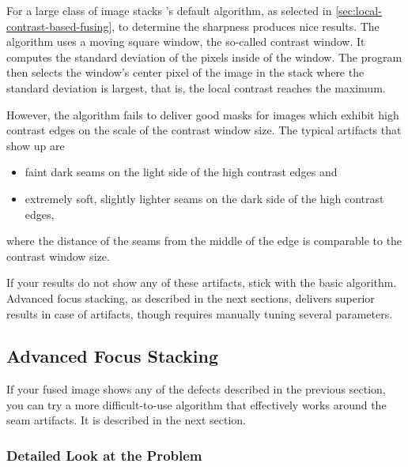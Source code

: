 For a large class of image stacks \App{}'s default algorithm, as selected in
\ref{sec:local-contrast-based-fusing}, to determine the sharpness produces nice results.  The
algorithm uses a moving square window, the so-called contrast window.  It computes the standard
deviation of the pixels inside of the window.  The program then selects the window's center
pixel of the image in the stack where the standard deviation is largest, that is, the local
contrast reaches the maximum.

However, the algorithm fails to deliver good masks for images which exhibit high contrast edges
on the scale of the contrast window size.  The typical artifacts that show up are

\begin{itemize}
\item
  faint dark seams on the light side of the high contrast edges and

\item
  extremely soft, slightly lighter seams on the dark side of the high contrast edges,
\end{itemize}

\noindent where the distance of the seams from the middle of the edge is comparable to the
contrast window size.

If your results do not show any of these artifacts, stick with the basic algorithm.  Advanced
focus stacking, as described in the next sections, delivers superior results in case of
artifacts, though requires manually tuning several parameters.


\subsection[Advanced Focus Stacking]{\label{sec:advanced-focus-stacking}%
  Advanced Focus Stacking}

If your fused image shows any of the defects described in the previous section, you can try a
more difficult-to-use algorithm that effectively works around the seam artifacts.  It is
described in the next section.


\subsubsection[Detailed Look at the Problem]{\label{sec:detailed-look-at-the-problem}%
  Detailed Look at the Problem}

